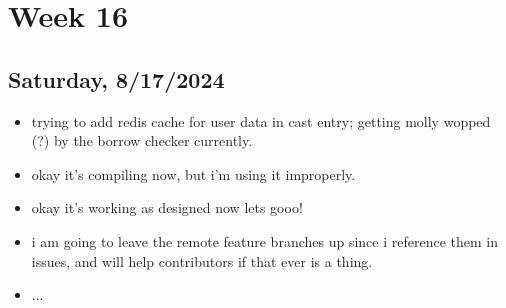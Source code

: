 \newpage
\section{Week 16}

\subsection*{Saturday, 8/17/2024}
\begin{itemize}
    \item trying to add redis cache for user data in cast entry; getting molly
        wopped (?) by the borrow checker currently.
    \item okay it's compiling now, but i'm using it improperly.
    \item okay it's working as designed now lets gooo!
    \item i am going to leave the remote feature branches up since i reference
        them in issues, and will help contributors if that ever is a thing.
    \item ...
\end{itemize}
